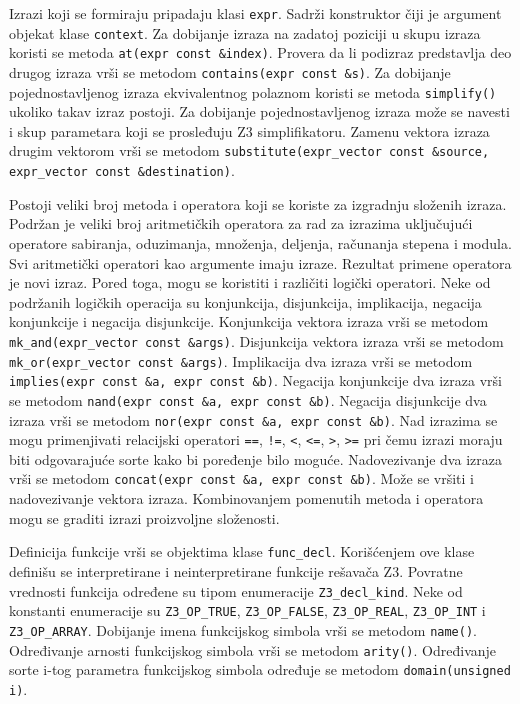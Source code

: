 \documentclass[12pt,oneside]{memoir}
\begin{document}
Izrazi koji se formiraju pripadaju klasi \texttt{expr}. Sadrži konstruktor čiji je argument objekat klase \texttt{context}. Za dobijanje izraza na zadatoj poziciji u skupu izraza koristi se metoda \texttt{at(expr const \&index)}.  Provera da li podizraz predstavlja deo drugog izraza vrši se metodom  \texttt{contains(expr const \&s)}. Za dobijanje pojednostavljenog izraza ekvivalentnog polaznom koristi se metoda \texttt{simplify()} ukoliko takav izraz postoji. Za dobijanje pojednostavljenog izraza može se navesti i skup parametara koji se prosleđuju Z3 simplifikatoru. Zamenu vektora izraza drugim vektorom vrši se metodom \texttt{substitute(expr\_vector const \&source, expr\_vector const \&destination)}. 
\par
Postoji veliki broj metoda i operatora koji se koriste za izgradnju složenih izraza. Podržan je veliki broj aritmetičkih operatora za rad za izrazima uključujući operatore sabiranja, oduzimanja, množenja, deljenja, računanja stepena i modula. Svi aritmetički operatori kao argumente imaju izraze. Rezultat primene operatora je novi izraz. Pored toga, mogu se koristiti i različiti logički operatori. Neke od podržanih logičkih operacija su konjunkcija, disjunkcija, implikacija, negacija konjunkcije i negacija disjunkcije. Konjunkcija vektora izraza vrši se metodom \texttt{mk\_and(expr\_vector const \&args)}. Disjunkcija vektora izraza vrši se metodom \texttt{mk\_or(expr\_vector const \&args)}. Implikacija dva izraza vrši se metodom \texttt{implies(expr const \&a, expr const \&b)}. Negacija konjunkcije dva izraza vrši se metodom \texttt{nand(expr const  \&a, expr const \&b)}. Negacija disjunkcije dva izraza vrši se metodom \texttt{nor(expr const \&a, expr const \&b)}. Nad izrazima se mogu primenjivati relacijski operatori \texttt{==}, \texttt{!=}, \texttt{<}, \texttt{<=}, \texttt{>}, \texttt{>=} pri čemu izrazi moraju biti odgovarajuće sorte kako bi poređenje bilo moguće. Nadovezivanje dva izraza vrši se metodom \texttt{concat(expr const \&a, expr const \&b)}. Može se vršiti i nadovezivanje vektora izraza. Kombinovanjem pomenutih metoda i operatora mogu se graditi izrazi proizvoljne složenosti. 	
\par
Definicija funkcije vrši se objektima klase \texttt{func\_decl}. Korišćenjem ove klase definišu se interpretirane i neinterpretirane funkcije rešavača Z3. 
Povratne vrednosti funkcija određene su tipom enumeracije \texttt{Z3\_decl\_kind}. Neke od konstanti enumeracije su \texttt{Z3\_OP\_TRUE}, \texttt{Z3\_OP\_FALSE}, \texttt{Z3\_OP\_REAL}, \texttt{Z3\_OP\_INT} i \texttt{Z3\_OP\_ARRAY}. Dobijanje imena funkcijskog simbola vrši se metodom \texttt{name()}. Određivanje arnosti funkcijskog simbola vrši se metodom \texttt{arity()}. Određivanje sorte i-tog parametra funkcijskog simbola određuje se metodom \texttt{domain(unsigned i)}. 
\par
\end{document}
